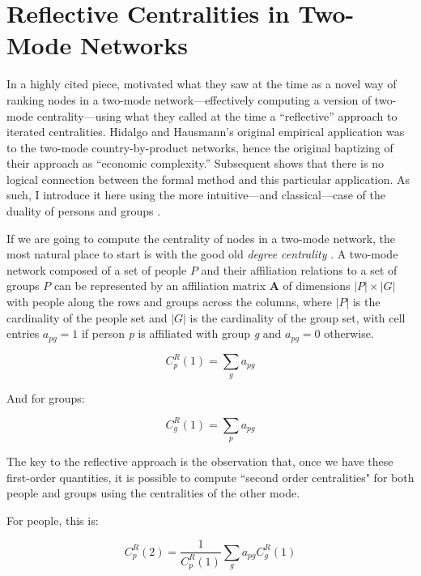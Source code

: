 \documentclass[a4paper,fleqn]{cas-sc}
\begin{document}
\section{Reflective Centralities in Two-Mode Networks}
In a highly cited piece, \citet{hidalgo2009building} motivated what they saw at the time as a novel way of ranking nodes in a two-mode network---effectively computing a version of two-mode centrality---using what they called at the time a ``reflective'' approach to iterated centralities. Hidalgo and Hausmann's original empirical application was to the two-mode country-by-product networks, hence the original baptizing of their approach as ``economic complexity.'' Subsequent shows that there is no logical connection between the formal method and this particular application. As such, I introduce it here using the more intuitive---and classical---case of the duality of persons and groups \citep{breiger1974duality}. 

If we are going to compute the centrality of nodes in a two-mode network, the most natural place to start is with the good old \textit{degree centrality} \citep{faust1997centrality}. A two-mode network composed of a set of people $P$ and their affiliation relations to a set of groups $P$ can be represented by an affiliation matrix $\mathbf{A}$ of dimensions $|P| \times |G|$ with people along the rows and groups across the columns, where $|P|$ is the cardinality of the people set and $|G|$ is the cardinality of the group set, with cell entries $a_{pg}= 1$ if person \textit{p} is affiliated with group \textit{g} and $a_{pg}= 0$ otherwise.

\begin{equation}
    C^R_p(1) = \sum_g a_{pg}
    \label{eq:R1_p}
\end{equation}


And for groups:

\begin{equation}
   C^R_g(1) = \sum_p a_{pg}
  \label{eq:R1_g}
\end{equation}

The key to the reflective approach is the observation that, once we have these first-order quantities, it is possible to compute ``second order centralities" for both people and groups using the centralities of the other mode. 

For people, this is:

\begin{equation}
    C^R_p(2) = \frac{1}{C^R_p(1)}\sum_g a_{pg}C^R_g(1)
    \label{eq:R2_p}
\end{equation}
\end{document}
